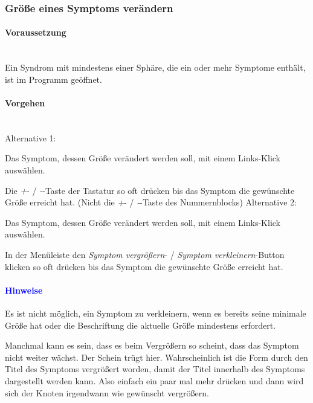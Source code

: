 \documentclass[enabledeprecatedfontcommands,fontsize=11pt,paper=a4,twoside]{scrartcl}
\newcounter{one}
\newcounter{two}[one]
\newcommand*{\hint}{\paragraph{\textcolor{blue}{Hinweise}}}
\newcommand*{\condition}{\paragraph{Voraussetzung}$\;$ \vspace{0.2cm}\\}
\newcommand*{\actions}{\paragraph{Vorgehen} $\;$\vspace{0.2cm}\\}
\newcommand*{\aOne}{\textcolor{bbe}{Alternative 1:}}
\newcommand*{\aTwo}{\textcolor{bbe}{Alternative 2:}}
\let\tempone\itemize
\let\temptwo\enditemize
\renewenvironment{itemize}{\tempone\addtolength{\itemsep}{-10.0pt}}{\temptwo}
\let\origenumerate\enumerate
\let\origendenumerate\endenumerate
\renewenvironment{enumerate}{\origenumerate \addtolength{\itemsep}{-10.0pt}}{\origendenumerate}
\begin{document}
\subsubsection{Größe eines Symptoms verändern}
					\condition 	
		Ein Syndrom mit mindestens einer Sphäre, die ein oder mehr Symptome enthält, ist im Programm geöffnet. 
		\actions
		\aOne
		\begin{enumerate}
			\item Das Symptom, dessen Größe verändert werden soll, mit einem Links-Klick auswählen. 
			\item Die \glqq\textit{+}\grqq- / \glqq\textit{-}\grqq-Taste der Tastatur so oft drücken bis das Symptom die gewünschte Größe erreicht hat. (Nicht die  \glqq\textit{+}\grqq- / \glqq\textit{-}\grqq-Taste des Nummernblocks)
		\end{enumerate}
		\aTwo
		\begin{enumerate}
			\item Das Symptom, dessen Größe verändert werden soll, mit einem Links-Klick auswählen. 
			\item  In der Menüleiste den \textit{Symptom vergrößern}- / \textit{Symptom verkleinern}-Button klicken so oft drücken bis das Symptom die gewünschte Größe erreicht hat.
		\end{enumerate}
		\hint
		\begin{itemize}
			\item Es ist nicht möglich, ein Symptom zu verkleinern, wenn es bereits seine minimale Größe hat oder die Beschriftung die aktuelle Größe mindestens erfordert. 
			\item Manchmal kann es sein, dass es beim Vergrößern so scheint, dass das Symptom nicht weiter wächst. Der Schein trügt hier. Wahrscheinlich ist die Form durch den Titel des Symptoms vergrößert worden, damit der Titel innerhalb des Symptoms dargestellt werden kann. Also einfach ein paar mal mehr drücken und dann wird sich der Knoten irgendwann wie gewünscht vergrößern. \\
		\end{itemize}
			
\end{document}
